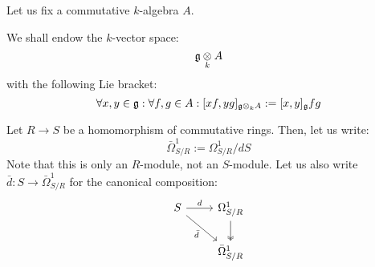         \begin{convention}
            Let us fix a commutative $k$-algebra $A$.

            We shall endow the $k$-vector space:
                $$\g \tensor_k A$$
            with the following Lie bracket:
                $$\forall x, y \in \g: \forall f, g \in A: [x f, y g]_{\g \tensor_k A} := [x, y]_{\g} fg$$
        \end{convention}

        \begin{convention}
            Let $R \to S$ be a homomorphism of commutative rings. Then, let us write:
                $$\bar{\Omega}^1_{S/R} := \Omega^1_{S/R}/dS$$
            Note that this is only an $R$-module, not an $S$-module. Let us also write $\bar{d}: S \to \bar{\Omega}^1_{S/R}$ for the canonical composition:
                $$
                    \begin{tikzcd}
                	S & {\Omega^1_{S/R}} \\
                	& {\bar{\Omega}^1_{S/R}}
                	\arrow["d", from=1-1, to=1-2]
                	\arrow[two heads, from=1-2, to=2-2]
                	\arrow["{\bar{d}}"', from=1-1, to=2-2]
                    \end{tikzcd}
                $$
        \end{convention}
        
